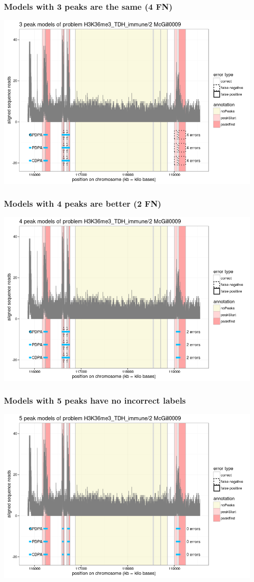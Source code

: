 \documentclass{beamer}
\begin{document}
\begin{frame}
  \frametitle{Models with 3 peaks are the same (4 FN)}
  \includegraphics[width=\textwidth]{figure-min-train-error-problem5-3peaks}
\end{frame}

\begin{frame}
  \frametitle{Models with 4 peaks are better (2 FN)}
  \includegraphics[width=\textwidth]{figure-min-train-error-problem5-4peaks}
\end{frame}

\begin{frame}
  \frametitle{Models with 5 peaks have no incorrect labels}
  \includegraphics[width=\textwidth]{figure-min-train-error-problem5-5peaks}
\end{frame}
\end{document}
